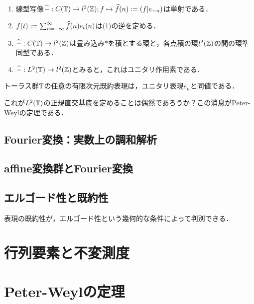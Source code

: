 \documentclass[uplatex,dvipdfmx]{jsreport}
\begin{document}
\begin{theorem}
    \begin{enumerate}
        \item 線型写像$\widehat{-}:C(\mathbb{T})\to l^2(\mathbb{Z});f\mapsto\widehat{f}(n):=(f|e_{-n})$は単射である．
        \item $f(t):=\sum^\infty_{n=-\infty}\widehat{f}(n)e_t(n)$は(1)の逆を定める．
        \item $\widehat{-}:C(\mathbb{T})\to l^2(\mathbb{Z})$は畳み込み$*$を積とする環と，各点積の環$l^2(\mathbb{Z})$の間の環準同型である．
        \item $\widehat{-}:L^2(\mathbb{T})\to l^2(\mathbb{Z})$とみると，これはユニタリ作用素である．
    \end{enumerate}
\end{theorem}

\begin{theorem}
    トーラス群$\mathbb{T}$の任意の有限次元既約表現は，ユニタリ表現$e_n$と同値である．
\end{theorem}
\begin{remarks}
    これが$L^2(\mathbb{T})$の正規直交基底を定めることは偶然であろうか？この消息がPeter-Weylの定理である．
\end{remarks}

\section{Fourier変換：実数上の調和解析}

\section{affine変換群とFourier変換}

\section{エルゴード性と既約性}

\begin{tcolorbox}[colframe=ForestGreen, colback=ForestGreen!10!white,breakable,colbacktitle=ForestGreen!40!white,coltitle=black,fonttitle=\bfseries\sffamily,
title=]
    表現の既約性が，エルゴード性という幾何的な条件によって判別できる．
\end{tcolorbox}


\chapter{行列要素と不変測度}

\chapter{Peter-Weylの定理}
\end{document}
